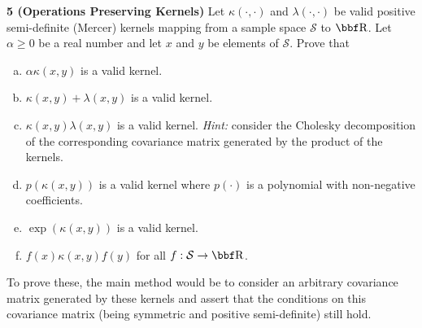 \documentclass[12pt,letterpaper,fleqn]{hmcpset}
\begin{document}
\textbf{5 (Operations Preserving Kernels)} Let $\kappa(\cdot,\cdot)$ and $\lambda(\cdot,\cdot)$ be valid positive
semi-definite (Mercer) kernels mapping from a sample space $\mathcal{S}$ to $\RR$. Let $\alpha \geq 0$ be a real number
and let $x$ and $y$ be elements of $\mathcal{S}$. Prove that
\begin{enumerate}[(a)]
    \item $\alpha\kappa(x,y)$ is a valid kernel.
    \item $\kappa(x,y) + \lambda(x,y)$ is a valid kernel.
    \item $\kappa(x,y)\lambda(x,y)$ is a valid kernel. \textit{Hint:} consider the Cholesky decomposition
        of the corresponding covariance matrix generated by the product of the kernels.
    \item $p(\kappa(x,y))$ is a valid kernel where $p(\cdot)$ is a polynomial
        with non-negative coefficients.
    \item $\exp(\kappa(x,y))$ is a valid kernel.
    \item $f(x)\kappa(x,y)f(y)$ for all $f : \mathcal{S}\to\RR$.
\end{enumerate}
To prove these, the main method would be to consider an arbitrary covariance matrix
generated by these kernels and assert that the conditions on this covariance matrix (being
symmetric and positive semi-definite) still hold.

\vspace{10mm}
\end{document}
